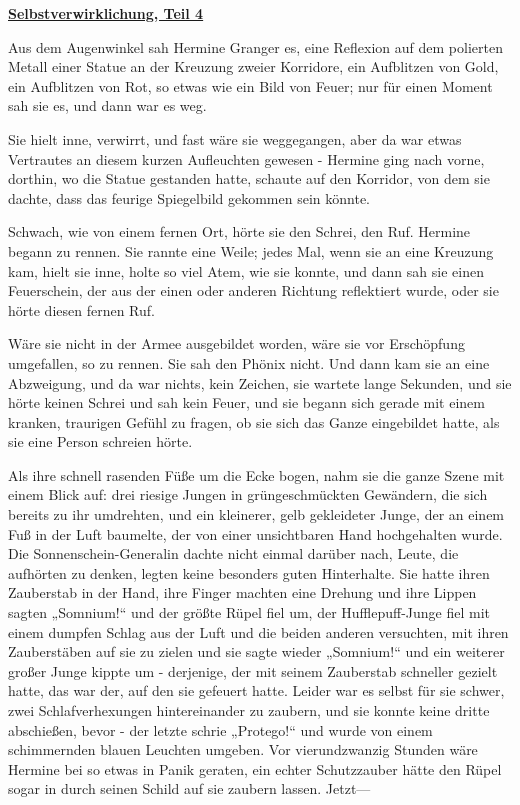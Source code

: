 

\hypertarget{selbstverwirklichung-teil-4}{%

\textbf{\uline{Selbstverwirklichung, Teil 4}}

Aus dem Augenwinkel sah Hermine Granger es, eine Reflexion auf dem polierten Metall einer Statue an der Kreuzung zweier Korridore, ein Aufblitzen von Gold, ein Aufblitzen von Rot, so etwas wie ein Bild von Feuer; nur für einen Moment sah sie es, und dann war es weg.

Sie hielt inne, verwirrt, und fast wäre sie weggegangen, aber da war etwas Vertrautes an diesem kurzen Aufleuchten gewesen - Hermine ging nach vorne, dorthin, wo die Statue gestanden hatte, schaute auf den Korridor, von dem sie dachte, dass das feurige Spiegelbild gekommen sein könnte.

Schwach, wie von einem fernen Ort, hörte sie den Schrei, den Ruf. Hermine begann zu rennen. Sie rannte eine Weile; jedes Mal, wenn sie an eine Kreuzung kam, hielt sie inne, holte so viel Atem, wie sie konnte, und dann sah sie einen Feuerschein, der aus der einen oder anderen Richtung reflektiert wurde, oder sie hörte diesen fernen Ruf.

Wäre sie nicht in der Armee ausgebildet worden, wäre sie vor Erschöpfung umgefallen, so zu rennen. Sie sah den Phönix nicht. Und dann kam sie an eine Abzweigung, und da war nichts, kein Zeichen, sie wartete lange Sekunden, und sie hörte keinen Schrei und sah kein Feuer, und sie begann sich gerade mit einem kranken, traurigen Gefühl zu fragen, ob sie sich das Ganze eingebildet hatte, als sie eine Person schreien hörte.

Als ihre schnell rasenden Füße um die Ecke bogen, nahm sie die ganze Szene mit einem Blick auf: drei riesige Jungen in grüngeschmückten Gewändern, die sich bereits zu ihr umdrehten, und ein kleinerer, gelb gekleideter Junge, der an einem Fuß in der Luft baumelte, der von einer unsichtbaren Hand hochgehalten wurde. Die Sonnenschein-Generalin dachte nicht einmal darüber nach, Leute, die aufhörten zu denken, legten keine besonders guten Hinterhalte. Sie hatte ihren Zauberstab in der Hand, ihre Finger machten eine Drehung und ihre Lippen sagten „Somnium!“ und der größte Rüpel fiel um, der Hufflepuff-Junge fiel mit einem dumpfen Schlag aus der Luft und die beiden anderen versuchten, mit ihren Zauberstäben auf sie zu zielen und sie sagte wieder „Somnium!“ und ein weiterer großer Junge kippte um - derjenige, der mit seinem Zauberstab schneller gezielt hatte, das war der, auf den sie gefeuert hatte. Leider war es selbst für sie schwer, zwei Schlafverhexungen hintereinander zu zaubern, und sie konnte keine dritte abschießen, bevor - der letzte schrie „Protego!“ und wurde von einem schimmernden blauen Leuchten umgeben. Vor vierundzwanzig Stunden wäre Hermine bei so etwas in Panik geraten, ein echter Schutzzauber hätte den Rüpel sogar in durch seinen Schild auf sie zaubern lassen. Jetzt—

}
